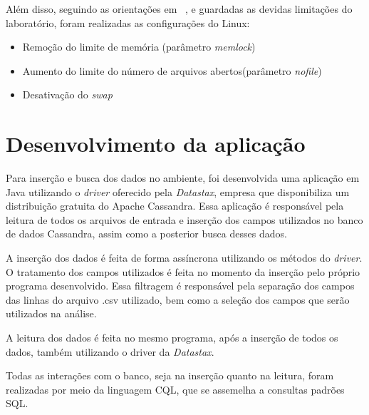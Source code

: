 Além disso, seguindo as orientações em ~\cite{cassandrasettings}, e guardadas as devidas limitações do laboratório, foram realizadas as configurações do Linux:
\begin{itemize}
	\item Remoção do limite de memória (parâmetro \emph{memlock})
	\item Aumento do limite do número de arquivos abertos(parâmetro \emph{nofile})
	\item Desativação do \emph{swap}
\end{itemize}

\section{Desenvolvimento da aplicação}
Para inserção e busca dos dados no ambiente, foi desenvolvida uma aplicação em Java utilizando o \emph{driver} oferecido pela \emph{Datastax}, empresa que disponibiliza um distribuição gratuita do Apache Cassandra. Essa aplicação é responsável pela leitura de todos os arquivos de entrada e inserção dos campos utilizados no banco de dados Cassandra, assim como a posterior busca desses dados.

A inserção dos dados é feita de forma assíncrona utilizando os métodos do \emph{driver}. O tratamento dos campos utilizados é feita no momento da inserção pelo próprio programa desenvolvido. Essa filtragem é responsável pela separação dos campos das linhas do arquivo .csv utilizado, bem como a seleção dos campos que serão utilizados na análise. 

A leitura dos dados é feita no mesmo programa, após a inserção de todos os dados, também utilizando o driver da \emph{Datastax}.

Todas as interações com o banco, seja na inserção quanto na leitura, foram realizadas por meio da linguagem CQL, que se assemelha a consultas padrões SQL.



